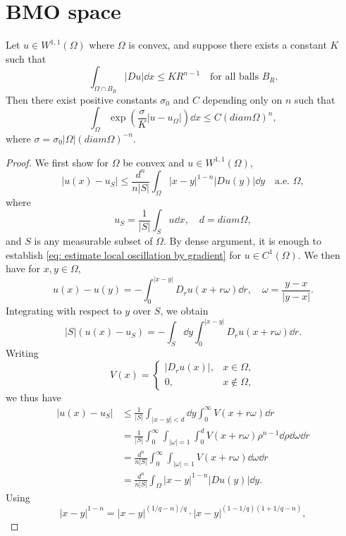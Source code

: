 \section{BMO space}
\begin{theorem}
	\label{thm: bmo estimates}
	Let $u\in W^{1,1}(\Omega)$ where $\Omega$ is convex, and suppose there exists a constant $K$ such that
	\[
		\int_{\Omega\cap B_R}|Du|\dd x \leq KR^{n-1}\quad\text{for all balls }B_R.
	\]
	Then there exist positive constants $\sigma_0$ and $C$ depending only on $n$ such that
	\[
		\int_\Omega \exp\left(\frac{\sigma}{K}|u-u_\Omega|\right)\dd x \leq C(diam \Omega)^n,
	\]
	where $\sigma = \sigma_0|\Omega|(diam \Omega)^{-n}$.
\end{theorem}
\begin{proof}
	We first show for $\Omega$ be convex and $u\in W^{1,1}(\Omega)$, 
	\begin{equation}
		\label{eq: estimate local oscillation by gradient}
		|u(x) - u_S| \leq \frac{d^n}{n|S|}\int_\Omega|x-y|^{1-n}|Du(y)|\dd y\quad\text{a.e. }\Omega,
	\end{equation}
	where 
	\[
		u_S = \frac{1}{|S|}\int_S u\dd x,\quad d = diam \Omega,
	\]
	and $S$ is any measurable subset of $\Omega$.
	By dense argument, it is enough to establish \eqref{eq: estimate local oscillation by gradient} for $u\in C^1(\Omega)$.
	We then have for $x,y\in\Omega$,
	\[
		u(x) - u(y) = - \int_0^{|x-y|} D_ru(x + r\omega)\dd r, \quad \omega = \frac{y-x}{|y-x|}.
	\]
	Integrating with respect to $y$ over $S$, we obtain
	\[
		|S|(u(x) - u_S) = - \int_S\dd y \int_0^{|x-y|}D_r u(x + r\omega)\dd r.
	\]
	Writing 
	\begin{equation*}
		V(x) = 
		\begin{cases}
			|D_ru(x)|, & x\in\Omega,\\
			0, & x\not\in\Omega,
		\end{cases}
	\end{equation*}
	we thus have 
	\begin{align*}
		|u(x) - u_S| 
		&\leq \frac{1}{|S|}\int_{|x-y|<d}\dd y \int_0^\infty V(x+r\omega)\dd r\\
		&= \frac{1}{|S|}\int_0^\infty\int_{|\omega|=1}\int_0^dV(x+r\omega)\rho^{n-1}\dd\rho\dd\omega\dd r\\
		&= \frac{d^n}{n|S|} \int_0^\infty\int_{|\omega|=1}V(x+r\omega)\dd\omega\dd r\\
		&= \frac{d^n}{n|S|} \int_\Omega |x-y|^{1-n}|Du(y)|\dd y.
	\end{align*}
	Using 
	\[
		|x-y|^{1-n} = |x-y|^{(1/q-n)/q} \cdot |x-y|^{(1-1/q)(1+1/q-n)},
\]
\end{proof}
